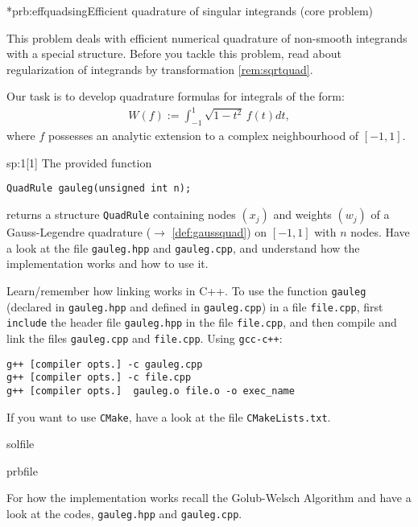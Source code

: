 
\begin{samproblem}*{prb:effquadsing}{Efficient quadrature of singular integrands (core problem)}{
 This problem deals with efficient numerical quadrature of non-smooth integrands with a special structure.
 Before you tackle this problem, read about regularization of integrands by transformation \cref{rem:sqrtquad}.

 Our task is to develop quadrature formulas for integrals of the form:
 \begin{align} \label{eq:effquadsingint}
  W(f) := \int_{-1}^1 \sqrt{1 - t^2}\, f(t) dt,
 \end{align}
 where $f$ possesses an analytic extension to a complex neighbourhood of $[-1,1]$.
}

\begin{subproblem}{sp:1}[1]
  The provided function
  \begin{lstlisting}[style=cpp]
QuadRule gauleg(unsigned int n);
  \end{lstlisting}
  returns a structure \verb|QuadRule| containing nodes $(x_j)$ and weights $(w_j)$
  of a Gauss-Legendre quadrature ($\to$ \cref{def:gaussquad}) on $[-1,1]$ with $n$ nodes. 
  Have a look at the file \verb|gauleg.hpp| and \verb|gauleg.cpp|, 
  and understand how the implementation works and how to use it.
 
  \begin{samhint}
    Learn/remember how linking works in C++. To use the function \verb|gauleg| 
    (declared in \verb|gauleg.hpp| and defined in \verb|gauleg.cpp|) in a file \verb|file.cpp|, 
    first \verb|include| the header file \verb|gauleg.hpp| in the file \verb|file.cpp|, 
    and then compile and link the files \verb|gauleg.cpp| and \verb|file.cpp|. Using \verb|gcc-c++|:
    \begin{lstlisting}
g++ [compiler opts.] -c gauleg.cpp
g++ [compiler opts.] -c file.cpp
g++ [compiler opts.]  gauleg.o file.o -o exec_name
    \end{lstlisting}
    If you want to use \verb|CMake|, have a look at the file \verb|CMakeLists.txt|.
  \end{samhint}
 
  \begin{samwriteprbpart}{solfile}
    \begin{writeverbatim}{prbfile}
      \begin{samsolution}
        For how the implementation works recall the Golub-Welsch Algorithm and have a look 
        at the codes, \verb|gauleg.hpp| and \verb|gauleg.cpp|.


\end{samsolution}
\end{writeverbatim}
\end{samwriteprbpart}
\end{subproblem}
\end{samproblem}

